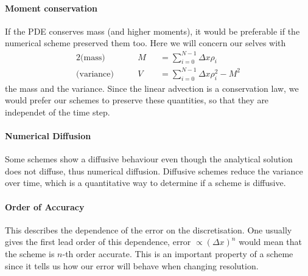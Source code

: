 \paragraph{Moment conservation}
If the PDE conserves mass (and higher moments), it would be preferable if the numerical scheme preserved them too. Here we will concern our selves with 
\begin{alignat}{2}
\text{(mass)}& \qquad M&&=\sum_{i=0}^{N-1} \Delta x\rho_i \\
\text{(variance)}&\qquad V&&=\sum_{i=0}^{N-1} \Delta x\rho_i ^2- M^2
\end{alignat}
the mass and the variance. Since the linear advection is a conservation law, we would prefer our schemes to preserve these quantities, so that they are independet of the time step.
\paragraph{Numerical Diffusion}
Some schemes show a diffusive behaviour even though the analytical solution does not diffuse, thus numerical diffusion. Diffusive schemes reduce the variance over time, which is a quantitative way to determine if a scheme is diffusive.  
\paragraph{Order of Accuracy}
This describes the dependence of the error on the discretisation. One usually gives the first lead order of this dependence,  error $\propto (\Delta x)^n$ would mean that the scheme is $n$-th order accurate. This is an important property of a scheme since it tells us how our error will behave when changing resolution.